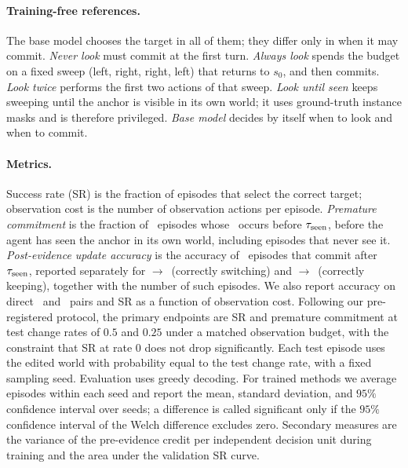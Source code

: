 \paragraph{Training-free references.}
The base model chooses the target in all of them; they differ only in when it may commit.
\emph{Never look} must commit at the first turn.
\emph{Always look} spends the budget on a fixed sweep (left, right, right, left) that returns to $s_0$, and then commits.
\emph{Look twice} performs the first two actions of that sweep.
\emph{Look until seen} keeps sweeping until the anchor is visible in its own world; it uses ground-truth instance masks and is therefore privileged.
\emph{Base model} decides by itself when to look and when to commit.

\paragraph{Metrics.}
Success rate (SR) is the fraction of episodes that select the correct target; observation cost is the number of observation actions per episode.
\emph{Premature commitment} is the fraction of \Look\ episodes whose \commit\ occurs before $\tau_{\mathrm{seen}}$, \ie before the agent has seen the anchor in its own world, including episodes that never see it.
\emph{Post-evidence update accuracy} is the accuracy of \Look\ episodes that commit after $\tau_{\mathrm{seen}}$, reported separately for \Look$\to$\Flip\ (correctly switching) and \Look$\to$\Stay\ (correctly keeping), together with the number of such episodes.
We also report accuracy on direct \Flip\ and \Stay\ pairs and SR as a function of observation cost.
Following our pre-registered protocol, the primary endpoints are SR and premature commitment at test change rates of $0.5$ and $0.25$ under a matched observation budget, with the constraint that SR at rate $0$ does not drop significantly.
Each test episode uses the edited world with probability equal to the test change rate, with a fixed sampling seed.
Evaluation uses greedy decoding.
For trained methods we average episodes within each seed and report the mean, standard deviation, and $95\%$ confidence interval over seeds; a difference is called significant only if the $95\%$ confidence interval of the Welch difference excludes zero.
Secondary measures are the variance of the pre-evidence credit per independent decision unit during training and the area under the validation SR curve.

